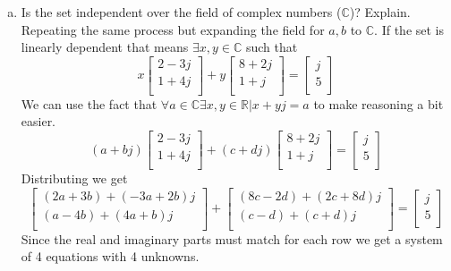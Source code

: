 \documentclass{article}
\begin{document}
\begin{enumerate}[a)]
\item Is the set independent over the field of complex numbers ($\mathbb{C}$)? Explain.
\newline
\newline
Repeating the same process but expanding the field for $a,b$ to $\mathbb{C}$.
If the set is linearly dependent that means $\exists x,y \in \mathbb{C}$ such that
$$
x
\begin{bmatrix}
2-3j \\
1+4j \\
\end{bmatrix}
+y
\begin{bmatrix}
8+2j \\
1+j \\
\end{bmatrix}
=
\begin{bmatrix}
j \\
5 \\
\end{bmatrix}
$$
We can use the fact that $\forall a \in \mathbb{C} \exists x,y \in \mathbb{R} | x+yj=a$ to make reasoning a bit easier.
$$
(a+bj)
\begin{bmatrix}
2-3j \\
1+4j \\
\end{bmatrix}
+(c+dj)
\begin{bmatrix}
8+2j \\
1+j \\
\end{bmatrix}
=
\begin{bmatrix}
j \\
5 \\
\end{bmatrix}
$$
Distributing we get
$$
\begin{bmatrix}
(2a+3b)+(-3a+2b)j \\
(a-4b)+(4a+b)j \\
\end{bmatrix}
+
\begin{bmatrix}
(8c-2d)+(2c+8d)j \\
(c-d)+(c+d)j \\
\end{bmatrix}
=
\begin{bmatrix}
j \\
5 \\
\end{bmatrix}
$$
Since the real and imaginary parts must match for each row we get a system of 4 equations with 4 unknowns.
\begin{align*}

\end{align*}
\end{enumerate}
\end{document}
